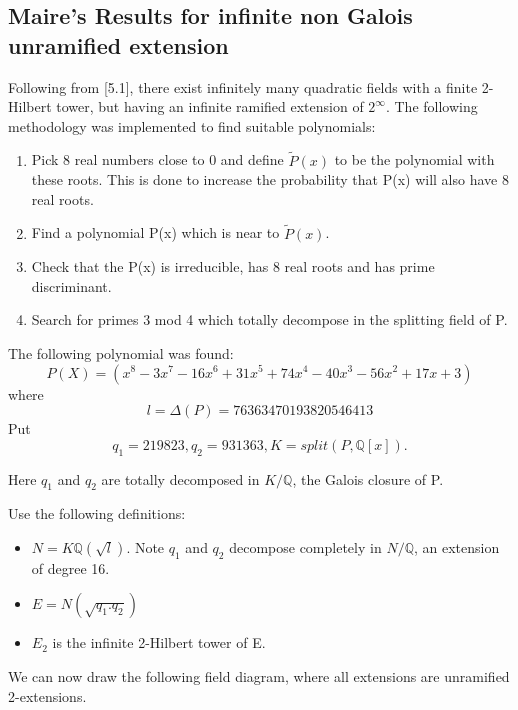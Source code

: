 \documentclass[preprint,12pt,reqno]{elsarticle}
\begin{document}
\subsection{Maire's Results for infinite non Galois unramified extension}
Following from \cite{MAIR}[5.1], there exist infinitely many quadratic fields with a finite 2-Hilbert tower, but having an infinite ramified extension of $2^{\infty{}}$. 
The following methodology was implemented  to find suitable polynomials:
\begin{enumerate}
    \item Pick 8 real numbers close to 0 and define $\tilde{P}(x)$ to be the polynomial with these roots. This is done to increase the probability that P(x) will also have 8 real roots. 
    \item Find a polynomial P(x) which is near to $\tilde{P}(x)$.
    \item Check that the P(x) is irreducible, has 8 real roots and has prime discriminant. 
    \item Search for primes 3 mod 4 which totally decompose in the splitting field of P. 
\end{enumerate}
The following polynomial was found: 
\begin{equation}
    P(X) = (x^8 - 3x^7 - 16x^6 + 31x^5 + 74x^4 - 40x^3 - 56x^2 + 17x + 3)
\end{equation}
where 
\begin{equation}
    l = \Delta(P) = 76363470193820546413
\end{equation}
Put \begin{equation}
    q_1 = 219823, q_2 = 931363, K = split(P, \mathbb{Q}[x]).
\end{equation}
\par
Here $q_1$ and  $q_2$ are totally decomposed in $K/\mathbb{Q}$, the Galois closure of P.
\par
Use the following definitions: 
\begin{itemize}
    \item $N = K\mathbb{Q}(\sqrt{l})$. Note $q_1$ and $q_2$ decompose completely in $N/\mathbb{Q}$, an extension of degree 16.
    \item $E = N(\sqrt{q_1.q_2})$
    \item $E_2$ is the infinite 2-Hilbert tower of E.
\end{itemize}
\par 
We can now draw the following field diagram, where all extensions are unramified 2-extensions. 
\end{document}
